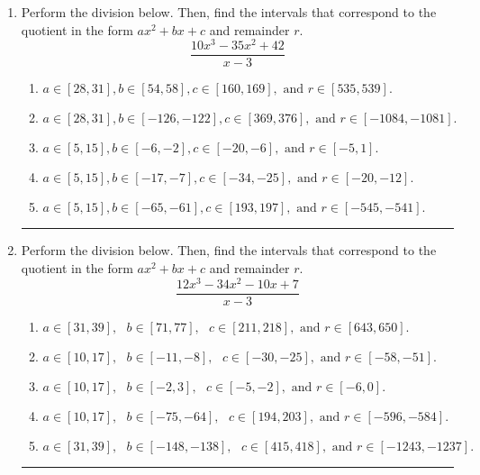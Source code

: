 \documentclass[14pt]{extbook}
\newcommand{\litem}[1]{\item#1\hspace*{-1cm}\rule{\textwidth}{0.4pt}}
\begin{document}
\begin{enumerate}
{\begin{enumerate}[label=\Alph*.]
\end{enumerate} }
\litem{
Perform the division below. Then, find the intervals that correspond to the quotient in the form $ax^2+bx+c$ and remainder $r$.\[ \frac{10x^{3} -35 x^{2} + 42}{x -3} \]\begin{enumerate}[label=\Alph*.]
\item \( a \in [28, 31], b \in [54, 58], c \in [160, 169], \text{ and } r \in [535, 539]. \)
\item \( a \in [28, 31], b \in [-126, -122], c \in [369, 376], \text{ and } r \in [-1084, -1081]. \)
\item \( a \in [5, 15], b \in [-6, -2], c \in [-20, -6], \text{ and } r \in [-5, 1]. \)
\item \( a \in [5, 15], b \in [-17, -7], c \in [-34, -25], \text{ and } r \in [-20, -12]. \)
\item \( a \in [5, 15], b \in [-65, -61], c \in [193, 197], \text{ and } r \in [-545, -541]. \)

\end{enumerate} }
\litem{
Perform the division below. Then, find the intervals that correspond to the quotient in the form $ax^2+bx+c$ and remainder $r$.\[ \frac{12x^{3} -34 x^{2} -10 x + 7}{x -3} \]\begin{enumerate}[label=\Alph*.]
\item \( a \in [31, 39], \text{   } b \in [71, 77], \text{   } c \in [211, 218], \text{   and   } r \in [643, 650]. \)
\item \( a \in [10, 17], \text{   } b \in [-11, -8], \text{   } c \in [-30, -25], \text{   and   } r \in [-58, -51]. \)
\item \( a \in [10, 17], \text{   } b \in [-2, 3], \text{   } c \in [-5, -2], \text{   and   } r \in [-6, 0]. \)
\item \( a \in [10, 17], \text{   } b \in [-75, -64], \text{   } c \in [194, 203], \text{   and   } r \in [-596, -584]. \)
\item \( a \in [31, 39], \text{   } b \in [-148, -138], \text{   } c \in [415, 418], \text{   and   } r \in [-1243, -1237]. \)


\end{enumerate}}
\end{enumerate}
\end{document}
